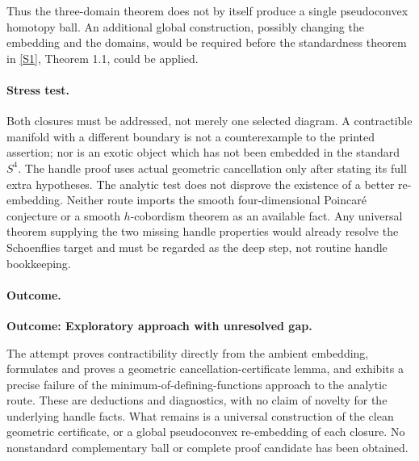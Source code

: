 \documentclass[11pt,a4paper]{article}
\newcommand{\sref}[2]{\hyperlink{source:#1:#2}{[S#2]}}
\numberwithin{equation}{section}
\begin{document}
Thus the three-domain theorem does not by itself produce a single
pseudoconvex homotopy ball. An additional global construction, possibly
changing the embedding and the domains, would be required before the
standardness theorem in \sref{165}{1}, Theorem 1.1, could be applied.

\paragraph{Stress test.}
Both closures must be addressed, not merely one selected diagram. A
contractible manifold with a different boundary is not a counterexample
to the printed assertion; nor is an exotic object which has not been
embedded in the standard $S^4$. The handle proof uses actual geometric
cancellation only after stating its full extra hypotheses. The analytic
test does not disprove the existence of a better re-embedding. Neither
route imports the smooth four-dimensional Poincar\'e conjecture or a
smooth $h$-cobordism theorem as an available fact. Any universal theorem
supplying the two missing handle properties would already resolve the
Schoenflies target and must be regarded as the deep step, not routine
handle bookkeeping.

\paragraph{Outcome.}
\textbf{Outcome: Exploratory approach with unresolved gap.}

The attempt proves contractibility directly from the ambient embedding,
formulates and proves a geometric cancellation-certificate lemma, and
exhibits a precise failure of the minimum-of-defining-functions approach
to the analytic route. These are deductions and diagnostics, with no
claim of novelty for the underlying handle facts. What remains is a
universal construction of the clean geometric certificate, or a global
pseudoconvex re-embedding of each closure. No nonstandard complementary
ball or complete proof candidate has been obtained.

\end{document}
